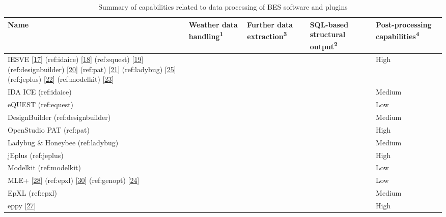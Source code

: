 \documentclass[3p, times]{elsarticle} %
\newcommand{\cmark}{\ding{51}}
\begin{document}
\begin{table}[!h]

\begin{threeparttable}
\caption{\label{tab:data-sum}Summary of capabilities related to data processing of BES software and plugins}
\centering
\fontsize{7}{9}\selectfont
\begin{tabular}[t]{>{\raggedright\arraybackslash}p{3.3cm}>{\centering\arraybackslash}p{2.5cm}>{\centering\arraybackslash}p{2.5cm}>{\centering\arraybackslash}p{2.5cm}>{\centering\arraybackslash}p{2.5cm}}
\toprule
Name & Weather data handling\textsuperscript{1} & Further data extraction\textsuperscript{3} & SQL-based structural output\textsuperscript{2} & Post-processing capabilities\textsuperscript{4}\\
\midrule
IESVE {[}\protect\hyperlink{ref-IntegratedEnvironmentalSolutionsLimited2020}{17}{]} (ref:idaice)
{[}\protect\hyperlink{ref-Kalamees2004}{18}{]} (ref:equest) {[}\protect\hyperlink{ref-Hirsch2020}{19}{]} (ref:designbuilder)
{[}\protect\hyperlink{ref-DesignBuilderSoftwareLtd2020a}{20}{]} (ref:pat) {[}\protect\hyperlink{ref-Guglielmetti2011}{21}{]} (ref:ladybug)
{[}\protect\hyperlink{ref-Roudsari2013}{25}{]} (ref:jeplus) {[}\protect\hyperlink{ref-Yi2020}{22}{]} (ref:modelkit) {[}\protect\hyperlink{ref-BigLadderSoftware2020}{23}{]} & \cmark & \cmark &  & High\\
IDA ICE (ref:idaice) &  & \cmark &  & Medium\\
eQUEST (ref:equest) &  & \cmark &  & Low\\
DesignBuilder (ref:designbuilder) &  & \cmark & \cmark & Medium\\
OpenStudio PAT (ref:pat) & \cmark & \cmark & \cmark & High\\
Ladybug \& Honeybee (ref:ladybug) & \cmark & \cmark &  & Medium\\
jEplus (ref:jeplus) &  & \cmark & \cmark & High\\
Modelkit (ref:modelkit) &  &  &  & Low\\
MLE+ {[}\protect\hyperlink{ref-Bernal2012}{28}{]} (ref:epxl) {[}\protect\hyperlink{ref-Schild2020}{30}{]} (ref:genopt) {[}\protect\hyperlink{ref-Wetter2001}{24}{]} &  &  &  & Low\\
EpXL (ref:epxl) &  & \cmark &  & Medium\\
eppy {[}\protect\hyperlink{ref-Philip2020}{27}{]} &  & \cmark &  & High\\
\bottomrule
\end{tabular}
\begin{tablenotes}

\end{tablenotes}
\end{threeparttable}
\end{table}
\end{document}
